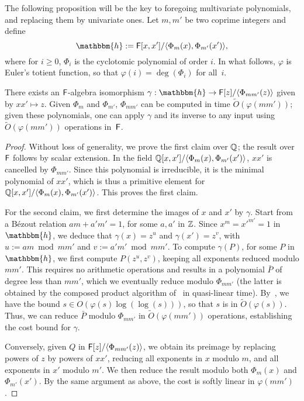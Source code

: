 The following proposition will be the key to foregoing multivariate
polynomials, and replacing them by univariate ones.  Let $m,m'$ be two
coprime integers and define
$$\mathbbm{h}:=\F[x,x']/\langle \Phi_{m}(x), \Phi_{m'}(x')\rangle,$$
where for $i \ge 0$, $\Phi_i$ is the cyclotomic polynomial of order
$i$. In what follows, $\varphi$ is Euler's totient function, so that
$\varphi(i) = \deg(\Phi_i)$ for all~$i$.
\begin{lemma}
  There exists an ${\mathsf{F}}$-algebra isomorphism $\gamma: \mathbbm{h} \to
  \F[z]/\langle\Phi_{mm'}(z)\rangle$ given by $xx' \mapsto z$.  Given
  $\Phi_m$ and $\Phi_{m'}$, $\Phi_{mm'}$ can be computed in time
  $\tilde{O}(\varphi(mm'))$; given these polynomials, one can
  apply $\gamma$ and its inverse to any input using
  $\tilde{O}(\varphi(mm'))$ operations in~${\mathsf{F}}$.
\end{lemma}
\begin{proof}
  Without loss of generality, we prove the first claim over $\mathbb{Q}$; the
  result over ${\mathsf{F}}$ follows by scalar extension. In the field \sloppy
  $\mathbb{Q}[x,x']/\langle \Phi_{m}(x), \Phi_{m'}(x')\rangle$, $xx'$ is
  cancelled by $\Phi_{mm'}$. Since this polynomial is irreducible, it
  is the minimal polynomial of $xx'$, which is thus a primitive
  element for $\mathbb{Q}[x,x']/\langle \Phi_{m}(x),
  \Phi_{m'}(x')\rangle$. This proves the first claim.

  For the second claim, we first determine the images of $x$ and $x'$
  by $\gamma$. Start from a B\'ezout relation $am+ a'm'=1$, for some
  $a,a'$ in $\mathbb{Z}$.  Since $x^m = {x'}^{m'}=1$ in $\mathbbm{h}$, we
  deduce that $\gamma(x)=z^{u}$ and $\gamma(x') = z^{v}$, with $u:=am
  \bmod mm'$ and $v:=a'm' \bmod mm'$. To compute $\gamma(P)$, for some
  $P$ in $\mathbbm{h}$, we first compute $P(z^u, z^v)$, keeping all
  exponents reduced modulo $mm'$. This requires no arithmetic
  operations and results in a polynomial $\bar P$ of degree less than
  $mm'$, which we eventually reduce modulo $\Phi_{mm'}$ (the latter is
  obtained by the composed product algorithm of~\cite{BoFlSaSc06} in
  quasi-linear time).  By~\citep[Theorem~8.8.7]{BacSha96}, we have the
  bound $s \in O(\varphi(s) \log(\log(s)))$, so that $s$ is in
  $\tilde{O}(\varphi(s))$. Thus, we can reduce $\bar P$ modulo
  $\Phi_{mm'}$ in $\tilde{O}(\varphi(mm'))$ operations, establishing
  the cost bound for $\gamma$.

  Conversely, given $Q$ in ${\mathsf{F}}[z]/\langle\Phi_{mm'}(z)\rangle$, we obtain
  its preimage by replacing powers of $z$ by powers of $xx'$, reducing all
  exponents in $x$ modulo $m$, and all exponents in $x'$ modulo $m'$.  We
  then reduce the result modulo both $\Phi_m(x)$ and $\Phi_{m'}(x')$.  By
  the same argument as above, the cost is softly linear in $\varphi(mm')$.
\end{proof}


